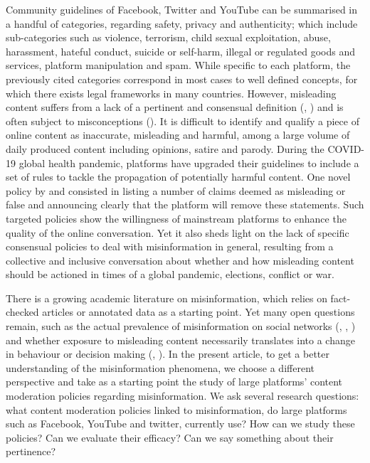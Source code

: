 \documentclass[Afour,sageh,times]{sagej}
\begin{document}
\smallskip

Community guidelines of Facebook, Twitter and YouTube can be summarised in a handful of categories, regarding safety, privacy and authenticity; which include sub-categories such as violence, terrorism, child sexual exploitation, abuse, harassment, hateful conduct, suicide or self-harm, illegal or regulated goods and services, platform manipulation and spam. While specific to each platform, the previously cited categories correspond in most cases to well defined concepts, for which there exists legal frameworks in many countries. However, misleading content suffers from a lack of a pertinent and consensual definition (\cite{fathaigh}, \cite{lazer}) and is often subject to misconceptions (\cite{Berriche2023}). It is difficult to identify and qualify a piece of online content as inaccurate, misleading and harmful, among a large volume of daily produced content including opinions, satire and parody. During the COVID-19 global health pandemic, platforms have upgraded their guidelines to include a set of rules to tackle the propagation of potentially harmful content. One novel policy by \cite{facebookcovid} and \cite{twittercovid} consisted in listing a number of claims deemed as misleading or false and announcing clearly that the platform will remove these statements. 
Such targeted policies show the willingness of mainstream platforms to enhance the quality of the online conversation. Yet it also sheds light on the lack of specific consensual policies to deal with misinformation in general, resulting from a collective and inclusive conversation about whether and how misleading content should be actioned in times of a global pandemic, elections, conflict or war.

There is a growing academic literature on misinformation, which relies on fact-checked articles or annotated data as a starting point. Yet many open questions remain, such as the actual prevalence of misinformation on social networks (\cite{grinberg}, \cite{guess2019less}, \cite{broniatowski}) and whether exposure to misleading content necessarily translates into a change in behaviour or decision making (\cite{valensise}, \cite{greene}). In the present article, to get a better understanding of the misinformation phenomena, we choose a different perspective and take as a starting point the study of large platforms' content moderation policies regarding misinformation. We ask several research questions: 
what content moderation policies linked to misinformation, do large platforms such as Facebook, YouTube and twitter, currently use? How can we study these policies? Can we evaluate their efficacy? Can we say something about their pertinence?
\end{document}
